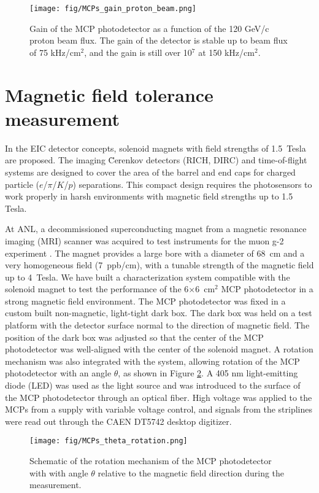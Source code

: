 \documentclass[preprint,5p]{elsarticle}
\begin{document}
\begin{figure}[tbp]
\centering 
\texttt{[image: fig/MCPs\_gain\_proton\_beam.png]}
\caption{Gain of the MCP photodetector as a function of the 120 GeV/c proton 
beam flux. The gain of the detector is stable up to beam flux of 75 kHz/cm$^2$, 
and the gain is still over 10$^7$ at 150 kHz/cm$^2$. } 
\label{fig:MCPs_gain_proton_beam}
\end{figure}

\section{Magnetic field tolerance measurement}\label{sec_B_measurement}
In the EIC detector concepts, solenoid magnets with field strengths of 
1.5~Tesla are proposed. The imaging \u Cerenkov detectors (RICH, DIRC) and 
time-of-flight systems are designed to cover the area of the barrel and end 
caps for charged particle ($e$/$\pi$/$K$/$p$) separations. This compact design 
requires the photosensors to work properly in harsh environments with magnetic 
field strengths up to 1.5 Tesla. 

At ANL, a decommissioned superconducting magnet from a magnetic resonance 
imaging (MRI) scanner was acquired to test instruments for the muon g-2 
experiment \cite{Magnet}. The magnet provides a large bore with a diameter of 
68~cm and a very homogeneous field (7~ppb/cm), with a tunable strength of the 
magnetic field up to 4~Tesla. We have built a characterization system 
compatible with the solenoid magnet to test the performance of the 
6$\times$6~cm$^2$ MCP photodetector in a strong magnetic field environment.  
The MCP photodetector was fixed in a custom built non-magnetic, light-tight 
dark box. The dark box was held on a test platform with the detector surface 
normal to the direction of magnetic field. The position of the dark box was 
adjusted so that the center of the MCP photodetector was well-aligned with the 
center of the solenoid magnet. A rotation mechanism was also integrated with 
the system, allowing rotation of the MCP photodetector with an angle 
$\theta$, as shown in Figure \ref{fig:MCPs_theta_rotation}. A 405 nm 
light-emitting diode (LED) was used as the light source and was introduced to 
the surface of the MCP photodetector through an optical fiber. High voltage was 
applied to the MCPs from a supply with variable voltage control, and signals 
from the striplines were read out through the CAEN DT5742 desktop digitizer.

\begin{figure}[tbp]
\centering 
\texttt{[image: fig/MCPs\_theta\_rotation.png]}
\caption{Schematic of the rotation mechanism of the MCP photodetector with 
with angle $\theta$ relative to the magnetic field direction during the 
measurement.} \label{fig:MCPs_theta_rotation}
\end{figure}
\end{document}
